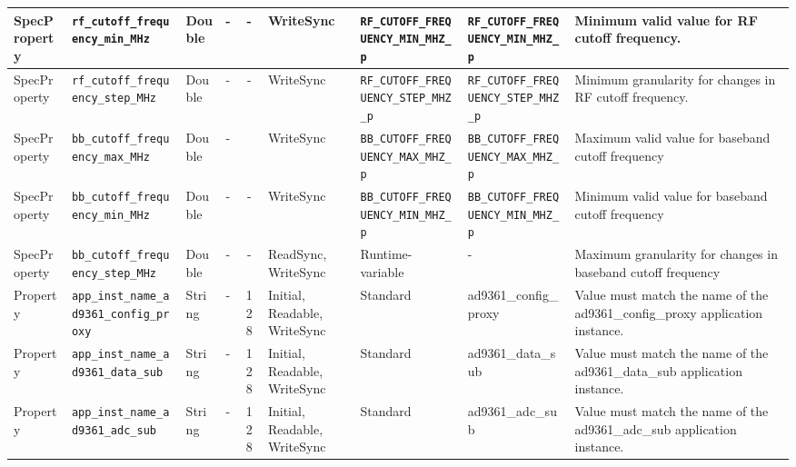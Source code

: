 \documentclass{article}
\begin{document}
\begin{landscape}
\begin{scriptsize}
\begin{longtable}{|p{1.8cm}|p{4.1cm}|p{1cm}|c|c|p{1.6cm}|p{3.7cm}|p{3.7cm}|p{2.5cm}|}
			\hline
			SpecProperty & \verb+rf_cutoff_frequency_min_MHz+  & Double& -        & -          & WriteSync      & \verb+RF_CUTOFF_FREQUENCY_MIN_MHZ_p+ & \verb+RF_CUTOFF_FREQUENCY_MIN_MHZ_p+  & Minimum valid value for RF cutoff frequency. \\
			\hline
			SpecProperty & \verb+rf_cutoff_frequency_step_MHz+ & Double& -        & -          & WriteSync      & \verb+RF_CUTOFF_FREQUENCY_STEP_MHZ_p+ & \verb+RF_CUTOFF_FREQUENCY_STEP_MHZ_p+ & Minimum granularity for changes in RF cutoff frequency. \\
			\hline
			SpecProperty & \verb+bb_cutoff_frequency_max_MHz+  & Double& -        & & WriteSync      & \verb+BB_CUTOFF_FREQUENCY_MAX_MHZ_p+ & \verb+BB_CUTOFF_FREQUENCY_MAX_MHZ_p+ & Maximum valid value for baseband cutoff frequency                                                                                                                                                                           \\
			\hline
			SpecProperty & \verb+bb_cutoff_frequency_min_MHz+  & Double& -        & -          & WriteSync      & \verb+BB_CUTOFF_FREQUENCY_MIN_MHZ_p+ & \verb+BB_CUTOFF_FREQUENCY_MIN_MHZ_p+ & Minimum valid value for baseband cutoff frequency                                                                                                                                                                           \\
			\hline
			SpecProperty & \verb+bb_cutoff_frequency_step_MHz+ & Double& -        & -          & ReadSync, WriteSync & Runtime-variable & - & Maximum granularity for changes in baseband cutoff frequency                                                                                                                                                                \\
			\hline
			Property & \verb+app_inst_name_ad9361_config_proxy+ &String& -        & 128        & Initial, Readable, WriteSync & Standard & ad9361\_config\_proxy & Value must match the name of the ad9361\_config\_proxy application instance. \\
			\hline
			Property & \verb+app_inst_name_ad9361_data_sub+ &String& -        & 128        & Initial, Readable, WriteSync & Standard & ad9361\_data\_sub & Value must match the name of the ad9361\_data\_sub application instance. \\
			\hline
			Property & \verb+app_inst_name_ad9361_adc_sub+ &String& -        & 128        & Initial, Readable, WriteSync & Standard & ad9361\_adc\_sub & Value must match the name of the ad9361\_adc\_sub application instance. \\

\end{longtable}
\end{scriptsize}
\end{landscape}
\end{document}
